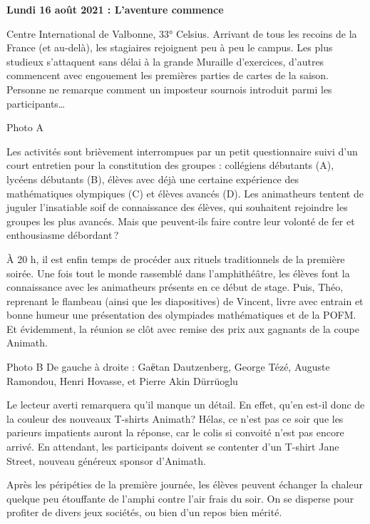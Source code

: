 \begin{center}
{\textbf{Lundi 16 août 2021 : L’aventure commence}}
\end{center}
\vspace{2mm}

Centre International de Valbonne, 33° Celsius. Arrivant de tous les recoins de la France (et au-delà), les stagiaires rejoignent peu à peu le campus. Les plus studieux s’attaquent sans délai à la grande Muraille d’exercices, d’autres commencent avec engouement les premières parties de cartes de la saison. Personne ne remarque comment un imposteur sournois introduit parmi les participants…

Photo A

Les activités sont brièvement interrompues par un petit questionnaire suivi d’un court entretien pour la constitution des groupes : collégiens débutants (A), lycéens débutants (B), élèves avec déjà une certaine expérience des mathématiques olympiques (C) et élèves avancés (D). Les animatheurs tentent de juguler l’insatiable soif de connaissance des élèves, qui souhaitent rejoindre les groupes les plus avancés. Mais que peuvent-ils faire contre leur volonté de fer et enthousiasme débordant ?

À 20 h, il est enfin temps de procéder aux rituels traditionnels de la première soirée. Une fois tout le monde rassemblé dans l’amphithéâtre, les élèves font la connaissance avec les animatheurs présents en ce début de stage. Puis, Théo, reprenant le flambeau (ainsi que les diapositives) de Vincent, livre avec entrain et bonne humeur une présentation des olympiades mathématiques et de la POFM. Et évidemment, la réunion se clôt avec remise des prix aux gagnants de la coupe Animath.

Photo B
De gauche à droite : Gaёtan Dautzenberg, George Tézé, Auguste Ramondou, Henri Hovasse, et Pierre Akin Dürrüoglu

Le lecteur averti remarquera qu’il manque un détail. En effet, qu’en est-il donc de la couleur des nouveaux T-shirts Animath? Hélas, ce n’est pas ce soir que les parieurs impatients auront la réponse, car le colis si convoité n’est pas encore arrivé. En attendant, les participants doivent se contenter d’un T-shirt Jane Street, nouveau généreux sponsor d’Animath.

Après les péripéties de la première journée, les élèves peuvent échanger la chaleur quelque peu étouffante de l’amphi contre l’air frais du soir.  On se disperse pour profiter de divers jeux sociétés, ou bien d’un repos bien mérité.